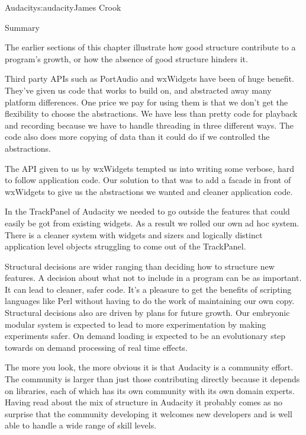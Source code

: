 \begin{aosachapter}{Audacity}{s:audacity}{James Crook}
\begin{aosasect1}{Summary}

The earlier sections of this chapter illustrate how good structure
contribute to a program's growth, or how the absence of good structure
hinders it.

\begin{aosaitemize}

\item Third party APIs such as PortAudio and wxWidgets have been of
  huge benefit.  They've given us code that works to build on, and
  abstracted away many platform differences.  One price we pay for
  using them is that we don't get the flexibility to choose the
  abstractions.  We have less than pretty code for playback and
  recording because we have to handle threading in three different
  ways.  The code also does more copying of data than it could do if
  we controlled the abstractions.

\item The API given to us by wxWidgets tempted us into writing some
  verbose, hard to follow application code.  Our solution to that was
  to add a facade in front of wxWidgets to give us the abstractions we
  wanted and cleaner application code.

\item In the TrackPanel of Audacity we needed to go outside the
  features that could easily be got from existing widgets.  As a
  result we rolled our own ad hoc system.  There is a cleaner system
  with widgets and sizers and logically distinct application level
  objects struggling to come out of the TrackPanel.

\item Structural decisions are wider ranging than deciding how to
  structure new features.  A decision about what not to include in a
  program can be as important.  It can lead to cleaner, safer code.
  It's a pleasure to get the benefits of scripting languages like Perl
  without having to do the work of maintaining our own copy.
  Structural decisions also are driven by plans for future growth.
  Our embryonic modular system is expected to lead to more
  experimentation by making experiments safer.  On demand loading is
  expected to be an evolutionary step towards on demand processing of
  real time effects.

\end{aosaitemize}

The more you look, the more obvious it is that Audacity is a community
effort.  The community is larger than just those contributing directly
because it depends on libraries, each of which has its own community
with its own domain experts.  Having read about the mix of structure
in Audacity it probably comes as no surprise that the community
developing it welcomes new developers and is well able to handle a
wide range of skill levels.


\end{aosasect1}
\end{aosachapter}
